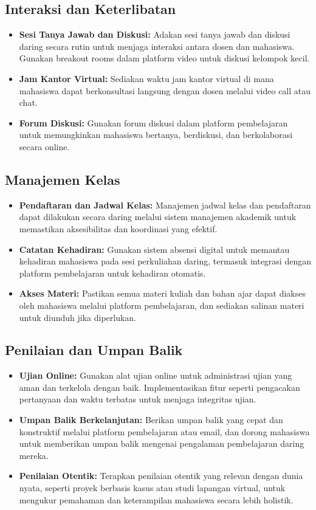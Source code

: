 \subsection{Interaksi dan Keterlibatan}
\begin{itemize}
	\item \textbf{Sesi Tanya Jawab dan Diskusi:} Adakan sesi tanya jawab dan diskusi daring secara rutin untuk menjaga interaksi antara dosen dan mahasiswa. Gunakan breakout rooms dalam platform video untuk diskusi kelompok kecil.
	\item \textbf{Jam Kantor Virtual:} Sediakan waktu jam kantor virtual di mana mahasiswa dapat berkonsultasi langsung dengan dosen melalui video call atau chat.
	\item \textbf{Forum Diskusi:} Gunakan forum diskusi dalam platform pembelajaran untuk memungkinkan mahasiswa bertanya, berdiskusi, dan berkolaborasi secara online.
\end{itemize}

\subsection{Manajemen Kelas}
\begin{itemize}
	\item \textbf{Pendaftaran dan Jadwal Kelas:} Manajemen jadwal kelas dan pendaftaran dapat dilakukan secara daring melalui sistem manajemen akademik untuk memastikan aksesibilitas dan koordinasi yang efektif.
	\item \textbf{Catatan Kehadiran:} Gunakan sistem absensi digital untuk memantau kehadiran mahasiswa pada sesi perkuliahan daring, termasuk integrasi dengan platform pembelajaran untuk kehadiran otomatis.
	\item \textbf{Akses Materi:} Pastikan semua materi kuliah dan bahan ajar dapat diakses oleh mahasiswa melalui platform pembelajaran, dan sediakan salinan materi untuk diunduh jika diperlukan.
\end{itemize}

\subsection{Penilaian dan Umpan Balik}
\begin{itemize}
	\item \textbf{Ujian Online:} Gunakan alat ujian online untuk administrasi ujian yang aman dan terkelola dengan baik. Implementasikan fitur seperti pengacakan pertanyaan dan waktu terbatas untuk menjaga integritas ujian.
	\item \textbf{Umpan Balik Berkelanjutan:} Berikan umpan balik yang cepat dan konstruktif melalui platform pembelajaran atau email, dan dorong mahasiswa untuk memberikan umpan balik mengenai pengalaman pembelajaran daring mereka.
	\item \textbf{Penilaian Otentik:} Terapkan penilaian otentik yang relevan dengan dunia nyata, seperti proyek berbasis kasus atau studi lapangan virtual, untuk mengukur pemahaman dan keterampilan mahasiswa secara lebih holistik.
\end{itemize}


